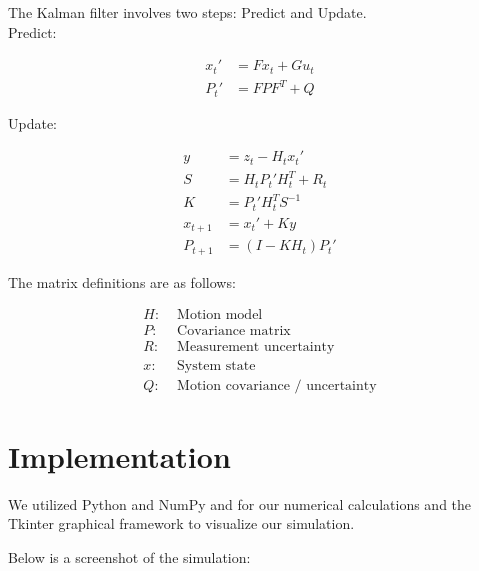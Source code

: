 \documentclass[prodmode,acmtecs]{acmsmall} %
\begin{document}
The Kalman filter involves two steps: Predict and Update. \\

Predict:

\begin{align*}
    x_t' &= F x_t + G u_t \\
    P_t' &= F P F^T + Q
\end{align*}

Update:

\begin{align*}
    y &= z_t - H_t x_t' \\
    S &= H_t P_t' H^T_t + R_t \\
    K &= P_t' H^T_t S^{-1} \\
    x_{t+1} &= x_t' + Ky \\
    P_{t+1} &= (I - K H_t) P_t'
\end{align*}

The matrix definitions are as follows:

\begin{align*}
    H:& \text{ Motion model}\\
    P:& \text{ Covariance matrix}\\
    R:& \text{ Measurement uncertainty}\\
    x:& \text{ System state}\\
    Q:& \text{ Motion covariance / uncertainty}
\end{align*}

\section{Implementation}

We utilized Python and NumPy and for our numerical calculations and the Tkinter graphical framework to visualize our simulation.

Below is a screenshot of the simulation:
\end{document}
